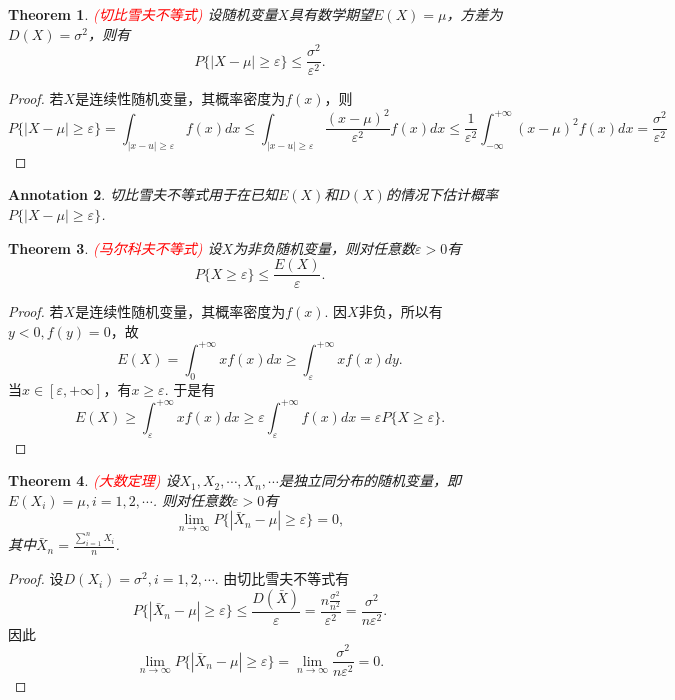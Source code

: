 \documentclass{article}
\newtheorem{theorem}{Theorem}[section]
\newtheorem{annotation}[theorem]{Annotation}
\newcommand{\redt}[1]{\textcolor{red}{#1}}
\begin{document}
\begin{theorem}
\rm \redt{(切比雪夫不等式)} 设随机变量$X$具有数学期望$E(X)=\mu$，方差为$D(X) = \sigma^2$，则有
$$
P\{|X-\mu| \geq \varepsilon \} \leq \frac{\sigma^2}{\varepsilon^2}. 
$$
\end{theorem}

\begin{proof}
若$X$是连续性随机变量，其概率密度为$f(x)$，则
$$
P\{|X-\mu| \geq \varepsilon \} = \int_{|x-u| \geq \varepsilon} f(x)dx \leq \int_{|x-u| \geq \varepsilon} \frac{(x-\mu)^2}{\varepsilon^2}f(x)dx \leq \frac{1}{\varepsilon^2}\int_{-\infty}^{+\infty}(x-\mu)^2f(x)dx =\frac{\sigma^2}{\varepsilon^2}
$$
\end{proof}

\begin{annotation}
\rm 切比雪夫不等式用于在已知$E(X)$和$D(X)$的情况下估计概率$P\{|X-\mu|\geq \varepsilon\}$. 
\end{annotation}

\begin{theorem}
\rm \redt{(马尔科夫不等式)} 设$X$为非负随机变量，则对任意数$\varepsilon > 0$有
$$
P\{X \geq \varepsilon\} \leq \frac{E(X)}{\varepsilon}.
$$
\end{theorem}

\begin{proof}
若$X$是连续性随机变量，其概率密度为$f(x)$. 因$X$非负，所以有$y < 0,f(y)=0$，故
$$
E(X) = \int_{0}^{+\infty} xf(x)dx \geq  \int_{\varepsilon}^{+\infty} xf(x)dy.
$$
当$x \in [\varepsilon,+\infty]$，有$x \geq \varepsilon$. 于是有
$$
E(X) \geq \int_{\varepsilon}^{+\infty} xf(x)dx \geq \varepsilon \int_{\varepsilon}^{+\infty}f(x)dx = \varepsilon P\{X \geq \varepsilon\}.
$$
\end{proof}

\begin{theorem}
\rm \redt{(大数定理)} 设$X_1,X_2,\cdots,X_n,\cdots$是独立同分布的随机变量，即$E(X_i) = \mu,i=1,2,\cdots$. 则对任意数$\varepsilon > 0$有
$$
\lim\limits_{n \rightarrow \infty}P\{|\bar{X}_n -\mu| \geq \varepsilon\} = 0,
$$ 
其中$\bar{X}_n = \frac{\sum\limits_{i=1}^n X_i}{n}$. 
\end{theorem}

\begin{proof}
设$D(X_i) = \sigma^2, i =1,2,\cdots$. 由切比雪夫不等式有
$$
P\{|\bar{X}_n -\mu| \geq \varepsilon\} \leq \frac{D(\bar{X})}{\varepsilon} = \frac{n\frac{\sigma^2}{n^2}}{\varepsilon^2} = \frac{\sigma^2}{n\varepsilon^2}. 
$$
因此
$$
\lim\limits_{n \rightarrow \infty} P\{|\bar{X}_n -\mu| \geq \varepsilon\} = \lim\limits_{n \rightarrow \infty} \frac{\sigma^2}{n\varepsilon^2} = 0.
$$
\end{proof}
\end{document}
